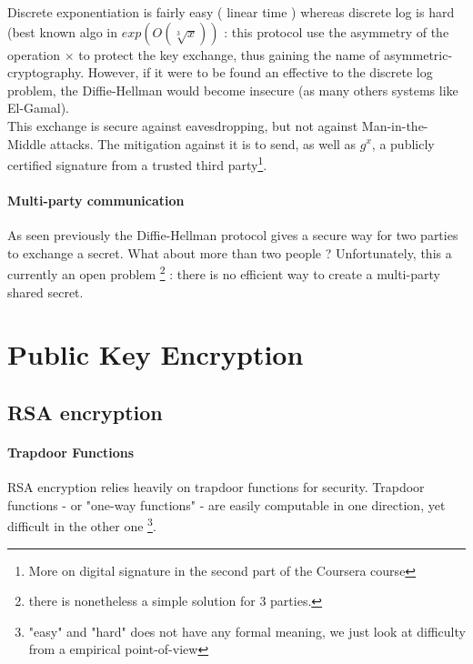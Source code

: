 Discrete exponentiation is fairly easy ( linear time ) whereas discrete log is hard (best known algo in $exp(O(\sqrt[3]{x}))$ : this protocol use the asymmetry of the operation $\times $ to protect the key exchange, thus gaining the name of asymmetric-cryptography. However, if it were to be found an effective to the discrete log problem, the Diffie-Hellman would become insecure (as many others systems like El-Gamal).\\

This exchange is secure against eavesdropping, but not against Man-in-the-Middle attacks. The mitigation against it is to send, as well as $g^x$, a publicly certified signature from a trusted third party\footnote{More on digital signature in the second part of the Coursera course}.\\

\paragraph{Multi-party communication}
As seen previously the Diffie-Hellman protocol gives a secure way for two parties to exchange a secret. What about more than two people ? Unfortunately, this a currently an open problem \footnote{there is nonetheless a simple solution for 3 parties.} : there is no efficient way to create a multi-party shared secret.


\section{Public Key Encryption}




\subsection{RSA encryption}


\paragraph{Trapdoor Functions}

RSA encryption relies heavily on trapdoor functions for security. Trapdoor functions - or "one-way functions" - are easily computable in one direction, yet difficult in the other one \footnote{"easy" and "hard" does not have any formal meaning, we just look at difficulty from a empirical point-of-view}. \\


